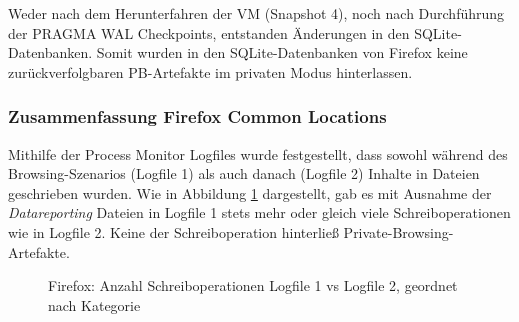 \begin{appendices}
Weder nach dem Herunterfahren der VM (Snapshot 4), noch nach Durchführung der PRAGMA WAL Checkpoints, entstanden Änderungen in den SQLite-Datenbanken.	
Somit wurden in den SQLite-Datenbanken von Firefox keine zurückverfolgbaren PB-Artefakte im privaten Modus hinterlassen.

\subsubsection*{Zusammenfassung Firefox Common Locations}
Mithilfe der Process Monitor Logfiles wurde festgestellt, dass sowohl während des Browsing-Szenarios (Logfile 1) als auch danach (Logfile 2) Inhalte in Dateien geschrieben wurden. Wie in Abbildung \ref{chart:firefox-writefile-logfile1v2} dargestellt, gab es mit Ausnahme der \textit{Datareporting} Dateien in Logfile 1 stets mehr oder gleich viele Schreiboperationen wie in Logfile 2. Keine der Schreiboperation hinterließ Private-Browsing-Artefakte.

\begin{figure}[h!]
	\caption{Firefox: Anzahl Schreiboperationen Logfile 1 vs Logfile 2, geordnet nach Kategorie}
	\label{chart:firefox-writefile-logfile1v2}
\end{figure}


\end{appendices}
